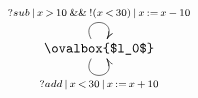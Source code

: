 $\xymatrix{
   \ovalbox{$l_0$} \ar@(ul,ur)[]^{?sub\,|\,x\,>\,10\:\&\&\:!(x\,<\,30)\,|\,x\,:=\,x\,-\,10} \ar@(dl,dr)[]_{?add\,|\,x\,<\,30\,|\,x\,:=\,x\,+\,10}
}$
